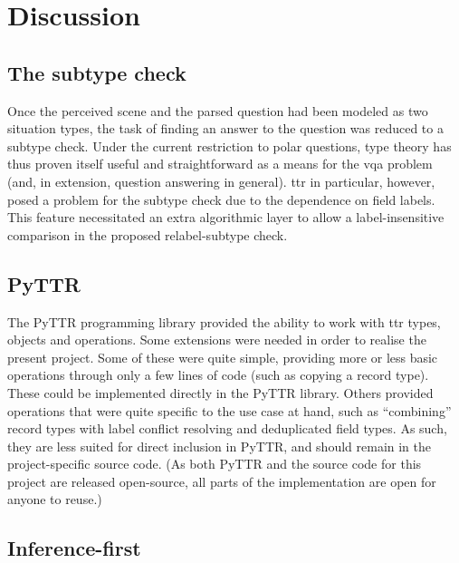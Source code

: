 \renewcommand{\sectionautorefname}{Section}
\let\subsectionautorefname\sectionautorefname
\let\subsubsectionautorefname\sectionautorefname
\section{Discussion}
\label{sec:discussion}



\subsection{The subtype check}
\label{sec:discussion-subtype}

Once the perceived scene and the parsed question had been modeled as two situation types, the task of finding an answer to the question was reduced to a subtype check.
Under the current restriction to polar questions, type theory has thus proven itself useful and straightforward as a means for the \gls{vqa} problem (and, in extension, question answering in general).
\gls{ttr} in particular, however, posed a problem for the subtype check due to the dependence on field labels.
This feature necessitated an extra algorithmic layer to allow a label-insensitive comparison in the proposed relabel-subtype check.



\subsection{PyTTR}
\label{sec:discussion-pyttr}

The PyTTR programming library provided the ability to work with \gls{ttr} types, objects and operations.
Some extensions were needed in order to realise the present project.
Some of these were quite simple, providing more or less basic operations through only a few lines of code (such as copying a record type).
These could be implemented directly in the PyTTR library.
Others provided operations that were quite specific to the use case at hand, such as ``combining'' record types with label conflict resolving and deduplicated field types.
As such, they are less suited for direct inclusion in PyTTR, and should remain in the project-specific source code.
(As both PyTTR and the source code for this project are released open-source, all parts of the implementation are open for anyone to reuse.)



\subsection{Inference-first}
\label{sec:discussion-inferencefirst}

